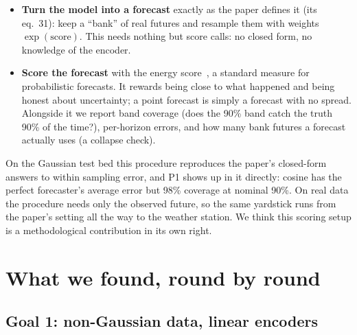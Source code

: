 \documentclass[11pt]{article}
\begin{document}
\begin{itemize}
\item \textbf{Turn the model into a forecast} exactly as the paper defines it (its eq.~31):
  keep a ``bank'' of real futures and resample them with weights $\exp(\text{score})$.
  This needs nothing but score calls: no closed form, no knowledge of the encoder.
\item \textbf{Score the forecast} with the energy score~\cite{gneiting}, a standard measure
  for probabilistic forecasts. It rewards being close to what happened and being honest
  about uncertainty; a point forecast is simply a forecast with no spread. Alongside it we
  report band coverage (does the 90\% band catch the truth 90\% of the time?), per-horizon
  errors, and how many bank futures a forecast actually uses (a collapse check).
\end{itemize}

On the Gaussian test bed this procedure reproduces the paper's closed-form answers to
within sampling error, and P1 shows up in it directly: cosine has the perfect forecaster's
average error but 98\% coverage at nominal 90\%. On real data the procedure needs only the
observed future, so the same yardstick runs from the paper's setting all the way to the
weather station. We think this scoring setup is a methodological contribution in its own
right.

\section{What we found, round by round}

\subsection{Goal 1: non-Gaussian data, linear encoders}
\end{document}
